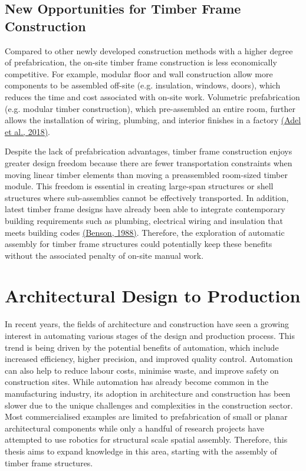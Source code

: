 \documentclass[11pt]{book}
\begin{document}
\subsection{New Opportunities for Timber Frame Construction}

Compared to other newly developed construction methods with a higher degree of prefabrication, the on-site timber frame construction is less economically competitive. For example, modular floor and wall construction allow more components to be assembled off-site (e.g. insulation, windows, doors), which reduces the time and cost associated with on-site work. Volumetric prefabrication (e.g. modular timber construction), which pre-assembled an entire room, further allows the installation of wiring, plumbing, and interior finishes in a factory \href{https://www.zotero.org/google-docs/?zzjLzT}{(Adel et al., 2018)}. 

Despite the lack of prefabrication advantages, timber frame construction enjoys greater design freedom because there are fewer transportation constraints when moving linear timber elements than moving a preassembled room-sized timber module. This freedom is essential in creating large-span structures or shell structures where sub-assemblies cannot be effectively transported. In addition, latest timber frame designs have already been able to integrate contemporary building requirements such as plumbing, electrical wiring and insulation that meets building codes \href{https://www.zotero.org/google-docs/?zzM1PB}{(Benson, 1988)}. Therefore, the exploration of automatic assembly for timber frame structures could potentially keep these benefits without the associated penalty of on-site manual work.

\section{Architectural Design to Production}

In recent years, the fields of architecture and construction have seen a growing interest in automating various stages of the design and production process. This trend is being driven by the potential benefits of automation, which include increased efficiency, higher precision, and improved quality control. Automation can also help to reduce labour costs, minimise waste, and improve safety on construction sites. While automation has already become common in the manufacturing industry, its adoption in architecture and construction has been slower due to the unique challenges and complexities in the construction sector. Most commercialised examples are limited to prefabrication of small or planar architectural components while only a handful of research projects have attempted to use robotics for structural scale spatial assembly. Therefore, this thesis aims to expand knowledge in this area, starting with the assembly of timber frame structures.
\end{document}
